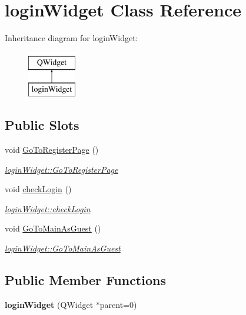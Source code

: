 \hypertarget{classloginWidget}{\section{login\-Widget Class Reference}
\label{classloginWidget}
}
Inheritance diagram for login\-Widget\-:\begin{figure}[H]
\begin{center}
\leavevmode
\includegraphics[height=2.000000cm]{classloginWidget}
\end{center}
\end{figure}
\subsection*{Public Slots}
\begin{DoxyCompactItemize}
\item 
void \hyperlink{classloginWidget_afcb096399c33f93111861cf221c833bb}{Go\-To\-Register\-Page} ()
\begin{DoxyCompactList}\small\item\em \hyperlink{classloginWidget_afcb096399c33f93111861cf221c833bb}{login\-Widget\-::\-Go\-To\-Register\-Page} \end{DoxyCompactList}\item 
void \hyperlink{classloginWidget_afbc51bef452e79a14eeaf3fbd3c716ec}{check\-Login} ()
\begin{DoxyCompactList}\small\item\em \hyperlink{classloginWidget_afbc51bef452e79a14eeaf3fbd3c716ec}{login\-Widget\-::check\-Login} \end{DoxyCompactList}\item 
void \hyperlink{classloginWidget_ab19c0e07c66cdbf37ebd73d32c4c581d}{Go\-To\-Main\-As\-Guest} ()
\begin{DoxyCompactList}\small\item\em \hyperlink{classloginWidget_ab19c0e07c66cdbf37ebd73d32c4c581d}{login\-Widget\-::\-Go\-To\-Main\-As\-Guest} \end{DoxyCompactList}\end{DoxyCompactItemize}
\subsection*{Public Member Functions}
\begin{DoxyCompactItemize}
\item 
\hypertarget{classloginWidget_a4fc020d7888ff7ed679629e39c362732}{{\bfseries login\-Widget} (Q\-Widget $\ast$parent=0)}\label{classloginWidget_a4fc020d7888ff7ed679629e39c362732}

\end{DoxyCompactItemize}
